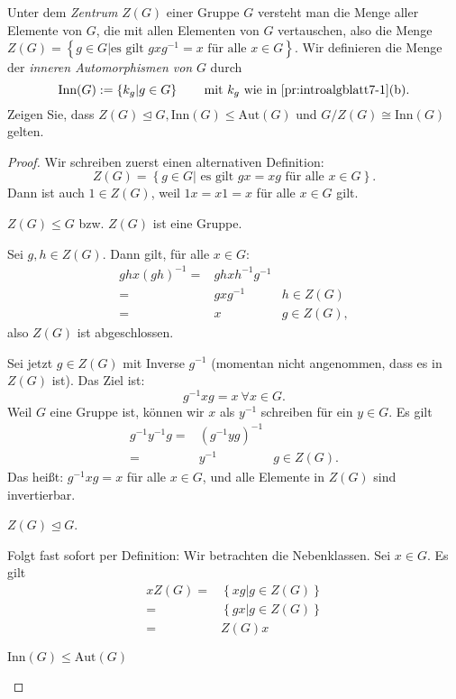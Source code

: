 \begin{Problem}
	Unter dem \emph{Zentrum} $Z(G)$ einer Gruppe $G$ versteht man die Menge aller Elemente von $G$, die mit allen Elementen von $G$ vertauschen, also die Menge $Z(G)=\left\{ g\in G|\text{es gilt }gxg^{-1}=x\text{ f\"{u}r alle }x\in G \right\} $. Wir definieren die Menge der \emph{inneren Automorphismen von} $G$ durch
\[
	\text{Inn}(G):=\left\{ k_g|g\in G \right\} \qquad\text{mit }k_g\text{ wie in \ref{pr:introalgblatt7-1}(b)}
.\] 
Zeigen Sie, dass $Z(G)\trianglelefteq G,\text{Inn}(G)\le \text{Aut}(G)$ und $G / Z(G)\cong \text{Inn}(G)$ gelten.
\end{Problem}
\begin{proof}
	Wir schreiben zuerst einen alternativen Definition:
	\[
		Z(G)=\left\{ g\in G|\text{ es gilt }gx=xg\text{ f\"{u}r alle }x\in G \right\} 
	.\] 
	Dann ist auch $1\in Z(G)$, weil $1x=x 1=x$ f\"{u}r alle $x\in G$ gilt.
	\begin{parts}
	\item $Z(G)\le G$ bzw. $Z(G)$ ist eine Gruppe.

		Sei $g,h\in Z(G)$. Dann gilt, f\"{u}r alle $x\in G$:
		\begin{align*}
			ghx(gh)^{-1}=&ghxh^{-1}g^{-1}\\
			=&gxg^{-1} & h\in Z(G)\\
			=&x & g\in Z(G),
		\end{align*}
		also $Z(G)$ ist abgeschlossen.

		Sei jetzt $g\in Z(G)$ mit Inverse $g^{-1}$ (momentan nicht angenommen, dass es in $Z(G)$ ist). Das Ziel ist:
		\[
			g^{-1}xg=x~\forall x\in G
		.\] 
		Weil $G$ eine Gruppe ist, können wir $x$ als $y^{-1}$ schreiben f\"{u}r ein $y\in G$. Es gilt
		\begin{align*}
			g^{-1}y^{-1}g=&(g^{-1}yg)^{-1}\\
			=&y^{-1} & g\in Z(G).
		\end{align*}
		Das heißt: $g^{-1}xg=x$ f\"{u}r alle $x\in G$, und alle Elemente in $Z(G)$ sind invertierbar.
	\item $Z(G)\trianglelefteq G$.

		Folgt fast sofort per Definition: Wir betrachten die Nebenklassen. Sei $x\in G$. Es gilt
		\begin{align*}
			xZ(G)=&\left\{ xg|g\in Z(G) \right\}\\
		=&\left\{ gx|g\in Z(G) \right\} \\
		=& Z(G)x
		\end{align*}
	\item $\text{Inn}(G)\le \text{Aut}(G)$


\end{parts}
\end{proof}

